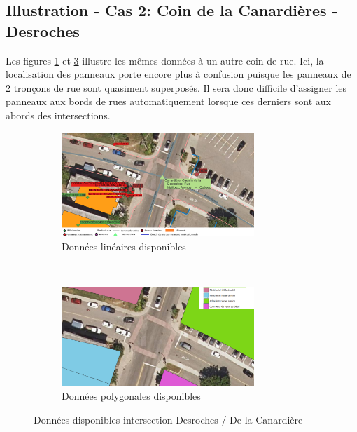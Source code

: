   \subsection{Illustration - Cas 2: Coin de la Canardières - Desroches}
  Les figures \ref{fig:donnes_panneaux_Desroches} et \ref{fig:donnes_polygone_panneaux_Desroches} illustre les mêmes données à un autre coin de rue. Ici, la localisation des panneaux porte encore plus à confusion puisque les panneaux de 2 tronçons de rue sont quasiment superposés. Il sera donc difficile d'assigner les panneaux aux bords de rues automatiquement lorsque ces derniers sont aux abords des intersections.
  \begin{figure}[ht]
    \centering
    \begin{subfigure}{\linewidth}
      \centering
      \includegraphics[width=0.8\textwidth]{images/donnees_disponible_Desroches_legende_v2.png}
    \caption{Données linéaires disponibles}
    \label{fig:donnes_panneaux_Desroches}
    \end{subfigure} \\
    \begin{subfigure}{\linewidth}
      \centering
      \includegraphics[width=0.8\textwidth]{images/utilisation_sols_Desroches_v2.png}
    \caption{Données polygonales disponibles}
    \label{fig:donnes_polygone_panneaux_Desroches}
    \end{subfigure}
    \caption{Données disponibles intersection Desroches / De la Canardière}
  \end{figure}
\FloatBarrier
